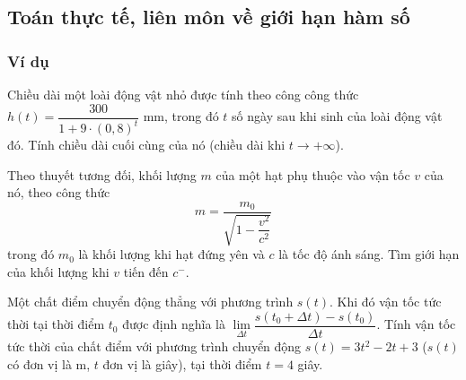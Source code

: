 
\subsection{Toán thực tế, liên môn về giới hạn hàm số}
\subsubsection{Ví dụ}
\begin{vd}%
Chiều dài một loài động vật nhỏ được tính theo công công thức $h(t)=\dfrac{300}{1+9 \cdot  (0{,}8)^t}$ mm, trong đó $t$ số ngày sau khi sinh của loài động vật đó. Tính chiều dài cuối cùng của nó (chiều dài khi $t \to +\infty$).
\end{vd}


\begin{vd}%
Theo thuyết tương đối, khối lượng $m$ của một hạt phụ thuộc vào vận tốc $v$ của nó, theo công thức
$$
m=\frac{m_0}{\sqrt{1-\dfrac{v^2}{c^2}}}
$$
trong đó $m_0$ là khối lượng khi hạt đứng yên và $c$ là tốc độ ánh sáng. Tìm giới hạn của khối lượng khi $v$ tiến đến $c^{-}$.
\end{vd}

\begin{vd}%
Một chất điểm chuyển động thẳng với phương trình $s(t)$. Khi đó vận tốc tức thời tại thời điểm $t_0$ được định nghĩa là $\displaystyle \lim \limits_{\Delta t} \dfrac{s(t_0+ \Delta t) - s(t_0)}{\Delta t}$. Tính vận tốc tức thời của chất điểm với phương trình chuyển động $s(t) = 3t^2-2t+3$ ($s(t)$ có đơn vị là m, $t$ đơn vị là giây), tại thời điểm $t=4$ giây. 
\end{vd}

